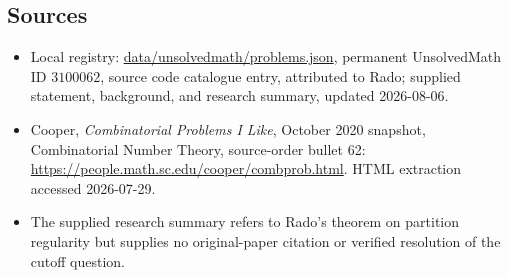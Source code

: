 \documentclass[11pt]{article}
\begin{document}
\subsection{Sources}
\begin{itemize}
\item Local registry: \url{data/unsolvedmath/problems.json}, permanent UnsolvedMath ID \(3100062\), source code catalogue entry, attributed to Rado; supplied statement, background, and research summary, updated 2026-08-06.
\item Cooper, \emph{Combinatorial Problems I Like}, October 2020 snapshot, Combinatorial Number Theory, source-order bullet 62: \url{https://people.math.sc.edu/cooper/combprob.html}. HTML extraction accessed 2026-07-29.
\item The supplied research summary refers to Rado's theorem on partition regularity but supplies no original-paper citation or verified resolution of the cutoff question.
\end{itemize}
\end{document}
